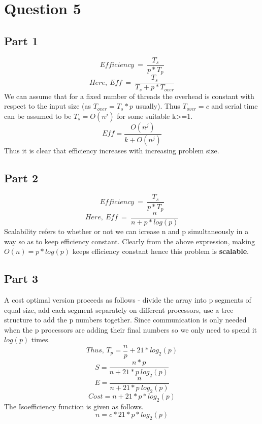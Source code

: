 \documentclass[11pt,a4paper]{article}
\begin{document}
\section{Question 5}

\subsection{Part 1}

$$ Efficiency\:=\:\dfrac{T_s}{p*T_p}$$
$$Here,\:Eff\:=\:\dfrac{T_s}{T_s+p*T_{over}}$$
We can assume that for a fixed number of threads the overhead is constant with respect to the input size (as $T_{over} = T_s*p$ usually). Thus $T_{over} = c$ and serial time can be assumed to be $T_s = O(n^j)$ for some suitable k>=1.
$$ Eff = \dfrac{O(n^j)}{k+O(n^j)}$$
Thus it is clear that efficiency increases with increasing problem size. 
\subsection{Part 2}
$$ Efficiency\:=\:\dfrac{T_s}{p*T_p}$$
$$Here,\:Eff\:=\:\dfrac{n}{n+p*log(p)}$$
Scalability refers to whether or not we can icrease n and p simultaneously in a way so as to keep efficiency constant.
Clearly from the above expression,  making $O(n) = p*log(p)$ keeps efficiency constant hence this problem is \textbf{scalable}.
\subsection{Part 3}
A cost optimal version proceeds as follows - divide the array into p segments of equal size, add each segment separately on different processors, use a tree structure to add the p numbers together. Since communication is only needed when the p processors are adding their final numbers so we only need to spend it $log(p)$ times.\\
$$Thus,\,T_p=\dfrac{n}{p}+ 21*log_2(p)$$ 
$$S = \dfrac{n*p}{n+21*p\:log_2(p)}$$
$$E = \dfrac{n}{n+21*p\:log_2(p)}$$
$$Cost = n + 21*p*log_2(p)$$
The Isoefficiency function is given as follows.
$$ n= c*21*p*log_2(p)$$
\end{document}
